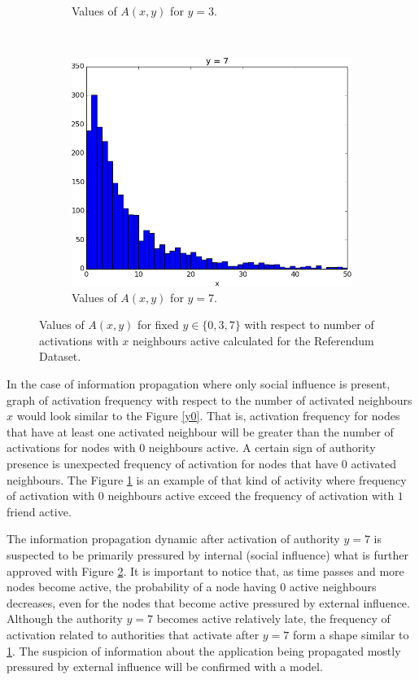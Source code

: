 \documentclass[times, utf8, zavrsni]{fer}
\begin{document}
\begin{figure}
\begin{subfigure}{\textwidth}
\caption{Values of $A(x, y)$ for $y=3$.}
\label{jutarnji1}
\end{subfigure}\\[1ex]
\begin{subfigure}{\textwidth}
\centering
\includegraphics[scale=0.4]{figs/034.png}
\caption{Values of $A(x, y)$ for $y=7$.}
\label{034}
\end{subfigure}
\caption{Values of $A(x,y)$ for fixed $y \in \{0, 3, 7\}$ with respect to number of activations with $x$ neighbours active calculated for the Referendum Dataset.}
\label{fig:test}
\end{figure}

In the  case of information propagation where only social influence is present, graph of activation frequency  with respect to the number of activated neighbours $x$ would look similar to the Figure \ref{y0}. That is, activation frequency for nodes that have at least one activated neighbour will be greater than the number of activations for nodes with $0$ neighbours active.  A certain sign of authority presence is unexpected frequency of activation for nodes that have $0$ activated neighbours. The Figure \ref{jutarnji1} is an example of that kind of activity where frequency of activation with $0$ neighbours active exceed the frequency of activation with $1$ friend active. 

The information propagation dynamic after activation of authority $y=7$ is suspected to be primarily pressured by internal (social influence) what is further approved with Figure \ref{034}. It is important to notice that, as time passes and more nodes become active, the probability of a node having $0$ active neighbours decreases, even for the nodes that become active pressured by external influence. Although the authority $y = 7$ becomes active relatively late, the frequency of activation related to authorities that activate after $y = 7$ form a shape similar to \ref{jutarnji1}. The suspicion of information about the application being propagated mostly pressured by external influence will be confirmed with a model.
\end{document}
